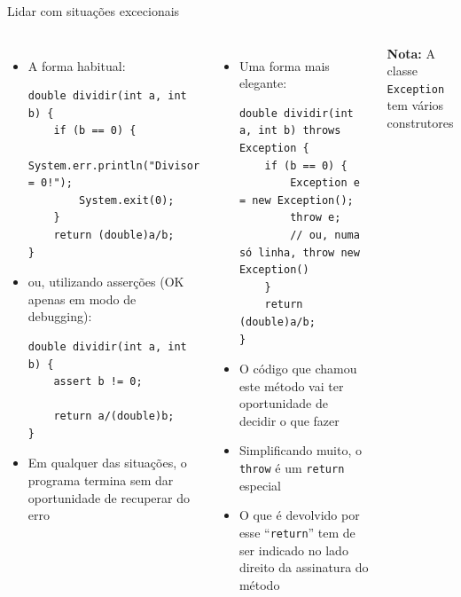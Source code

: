 \documentclass[portuguese, aspectratio=169, xcolor=table]{beamer}
\begin{document}
\begin{frame}[fragile]{Lidar com situações excecionais}
\scriptsize
\begin{columns}
\begin{itemize}
\item A forma habitual:
\begin{verbatim}
double dividir(int a, int b) {
    if (b == 0) {
        System.err.println("Divisor = 0!");
        System.exit(0);
    }
    return (double)a/b;
}
\end{verbatim}
\item ou, utilizando asserções (OK apenas em modo de debugging):
\begin{verbatim}
double dividir(int a, int b) {
    assert b != 0;

    return a/(double)b;
}
\end{verbatim}
\item Em qualquer das situações, o programa termina sem dar oportunidade de recuperar do erro
\end{itemize}
\begin{itemize}
\item Uma forma mais elegante:
\begin{verbatim}
double dividir(int a, int b) throws Exception {
    if (b == 0) {
        Exception e = new Exception();
        throw e;
        // ou, numa só linha, throw new Exception()
    }
    return (double)a/b;
}
\end{verbatim}
\item O código que chamou este método vai ter oportunidade de decidir o que fazer
\item Simplificando muito, o \texttt{throw} é um \texttt{return} especial
\item O que é devolvido por esse ``\texttt{return}'' tem de ser indicado no lado direito da assinatura do método

\end{itemize}

\vspace{1cm}

\textbf{Nota:} A classe \texttt{Exception} tem vários construtores
\end{columns}
\end{frame}
\end{document}

